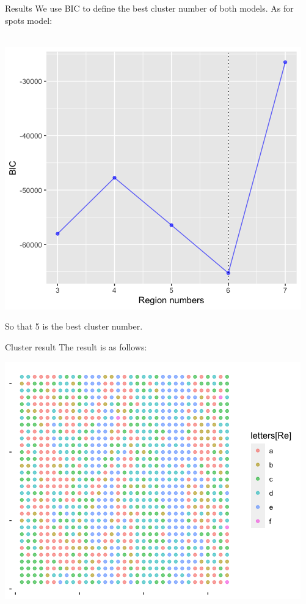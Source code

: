 \documentclass[10 pt]{beamer}
\begin{document}
\begin{frame}{Results}
We use BIC to define the best cluster number of both models.
As for spots model:
~\\
~\\
\centerline{\includegraphics[scale=0.5]{pic/sp_BIC.png}}


So that 5 is the best cluster number.
\end{frame}

\begin{frame}{Cluster result}
The result is as follows:
~\\
\centerline{\includegraphics[scale=0.4]{pic/spk6.png}}

\end{frame}
\end{document}

